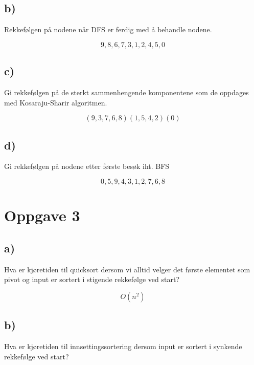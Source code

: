 \documentclass{article}
\begin{document}
    \subsection{b)}
    \begin{ans} 
        Rekkefølgen på nodene når DFS er ferdig med å behandle nodene.

        \[ 9,8,6,7,3,1,2,4,5,0 \]
    \end{ans}

    \subsection{c)}

    \begin{ans}
        Gi rekkefølgen på de sterkt sammenhengende komponentene som de oppdages med Kosaraju-Sharir algoritmen.

        \[ (9,3,7,6,8) (1,5,4,2) (0) \]


    \end{ans}

    \subsection{d)}


    \begin{ans}
    Gi rekkefølgen på nodene etter første besøk iht. BFS

    \[ 0,5,9,4,3,1,2,7,6,8\]
        
    \end{ans}

    \section{Oppgave 3}

    \subsection{a)}
    Hva er kjøretiden til quicksort dersom vi alltid velger det første elementet som pivot og input er sortert i stigende rekkefølge ved start?
    \begin{ans}
        \[ O(n^2) \]
    \end{ans}

    \subsection{b)}
    Hva er kjøretiden til innsettingssortering dersom input er sortert i synkende rekkefølge ved start?
\end{document}
